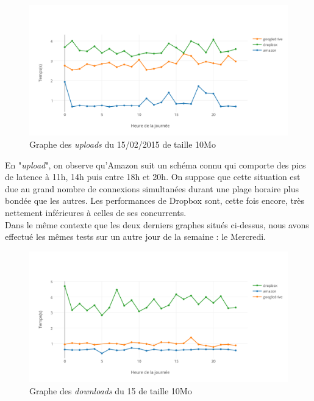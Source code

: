 \documentclass[10pt]{article}
\begin{document}
\begin{figure}[h] \centering
\includegraphics[scale=0.7]{graphe_du_15022015_pour_les_uploads_de_10mo.png}
\caption{Graphe des \textit{uploads} du 15/02/2015 de taille 10Mo} \end{figure}

En "\textit{upload}", on observe qu'Amazon suit un schéma connu qui comporte
des pics de latence à 11h, 14h puis entre 18h et 20h. On suppose que cette
situation est due au grand nombre de connexions simultanées durant une plage
horaire plus bondée que les autres. Les performances de Dropbox sont, cette
fois encore, très nettement inférieures à celles de ses concurrents.\\

Dans le même contexte que les deux derniers graphes situés ci-dessus, nous avons
effectué les mêmes tests sur un autre jour de la semaine : le Mercredi.\\

\begin{figure}[h] \centering
\includegraphics[scale=0.65]{graphe_des_downloads_du_18022015_de_taille_10mo.png}
\caption{Graphe des \textit{downloads} du 15 de taille 10Mo} \end{figure}
\end{document}
